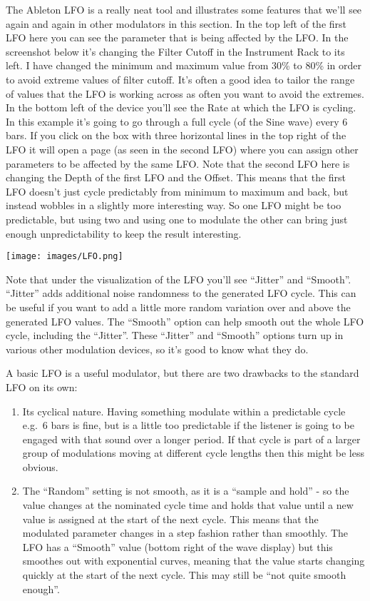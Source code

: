 \documentclass[
  12pt,
  letterpaper,
  oneside,
  open=any]{scrbook}
\begin{document}
The Ableton LFO is a really neat tool and illustrates some features that
we'll see again and again in other modulators in this section. In the
top left of the first LFO here you can see the parameter that is being
affected by the LFO. In the screenshot below it's changing the Filter
Cutoff in the Instrument Rack to its left. I have changed the minimum
and maximum value from 30\% to 80\% in order to avoid extreme values of
filter cutoff. It's often a good idea to tailor the range of values that
the LFO is working across as often you want to avoid the extremes. In
the bottom left of the device you'll see the Rate at which the LFO is
cycling. In this example it's going to go through a full cycle (of the
Sine wave) every 6 bars. If you click on the box with three horizontal
lines in the top right of the LFO it will open a page (as seen in the
second LFO) where you can assign other parameters to be affected by the
same LFO. Note that the second LFO here is changing the Depth of the
first LFO and the Offset. This means that the first LFO doesn't just
cycle predictably from minimum to maximum and back, but instead wobbles
in a slightly more interesting way. So one LFO might be too predictable,
but using two and using one to modulate the other can bring just enough
unpredictability to keep the result interesting.

\texttt{[image: images/LFO.png]}

Note that under the visualization of the LFO you'll see ``Jitter'' and
``Smooth''. ``Jitter'' adds additional noise randomness to the generated
LFO cycle. This can be useful if you want to add a little more random
variation over and above the generated LFO values. The ``Smooth'' option
can help smooth out the whole LFO cycle, including the ``Jitter''. These
``Jitter'' and ``Smooth'' options turn up in various other modulation
devices, so it's good to know what they do.

A basic LFO is a useful modulator, but there are two drawbacks to the
standard LFO on its own:

\begin{enumerate}
\def\labelenumi{\arabic{enumi}.}
\item
  Its cyclical nature. Having something modulate within a predictable
  cycle e.g.~6 bars is fine, but is a little too predictable if the
  listener is going to be engaged with that sound over a longer period.
  If that cycle is part of a larger group of modulations moving at
  different cycle lengths then this might be less obvious.
\item
  The ``Random'' setting is not smooth, as it is a ``sample and hold'' -
  so the value changes at the nominated cycle time and holds that value
  until a new value is assigned at the start of the next cycle. This
  means that the modulated parameter changes in a step fashion rather
  than smoothly. The LFO has a ``Smooth'' value (bottom right of the
  wave display) but this smoothes out with exponential curves, meaning
  that the value starts changing quickly at the start of the next cycle.
  This may still be ``not quite smooth enough''.
\end{enumerate}
\end{document}
